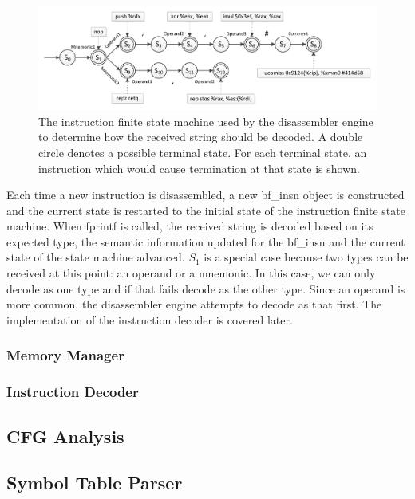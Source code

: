 \begin{figure}[H]
 \centering
 \includegraphics[scale=0.8]{Instruction_State_Machine.pdf}
 \caption[Hierarchy]{The instruction finite state machine used by the disassembler engine to determine how the received string should be decoded. A double circle denotes a possible terminal state. For each terminal state, an instruction which would cause termination at that state is shown.}
\label{fig:Instruction_State_Machine}
\end{figure}


Each time a new instruction is disassembled, a new bf\_insn object is constructed and the current state is restarted to the initial state of the instruction finite state machine. When fprintf is called, the received string is decoded based on its expected type, the semantic information updated for the bf\_insn and the current state of the state machine advanced. $S_1$ is a special case because two types can be received at this point: an operand or a mnemonic. In this case, we can only decode as one type and if that fails decode as the other type. Since an operand is more common, the disassembler engine attempts to decode as that first. The implementation of the instruction decoder is covered later.

\subsubsection{Memory Manager}

\subsubsection{Instruction Decoder}

\subsection{CFG Analysis}

\subsection{Symbol Table Parser}


